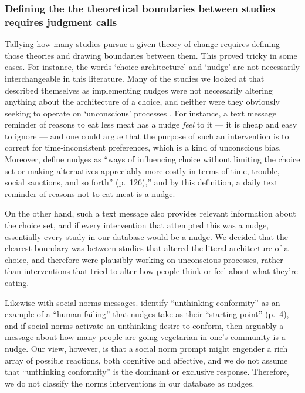 \documentclass[sn-nature,referee,pdflatex]{sn-jnl}
\begin{document}
\subsubsection{Defining the the theoretical boundaries between studies
requires judgment
calls}\label{defining-the-the-theoretical-boundaries-between-studies-requires-judgment-calls}

Tallying how many studies pursue a given theory of change requires
defining those theories and drawing boundaries between them. This proved
tricky in some cases. For instance, the words `choice architecture' and
`nudge' \citep{thaler2009} are not necessarily interchangeable in this
literature. Many of the studies we looked at that described themselves
as implementing nudges were not necessarily altering anything about the
architecture of a choice, and neither were they obviously seeking to
operate on `unconscious' processes \citep{garnett2020}. For instance, a
text message reminder of reasons to eat less meat has a nudge
\emph{feel} to it --- it is cheap and easy to ignore --- and one could
argue that the purpose of such an intervention is to correct for
time-inconsistent preferences, which is a kind of unconscious bias.
Moreover, \citep{hausman2010} define nudges as ``ways of influencing
choice without limiting the choice set or making alternatives
appreciably more costly in terms of time, trouble, social sanctions, and
so forth'' (p.~126),'' and by this definition, a daily text reminder of
reasons not to eat meat is a nudge.

On the other hand, such a text message also provides relevant
information about the choice set, and if every intervention that
attempted this was a nudge, essentially every study in our database
would be a nudge. We decided that the clearest boundary was between
studies that altered the literal architecture of a choice, and therefore
were plausibly working on unconscious processes, rather than
interventions that tried to alter how people think or feel about what
they're eating.

Likewise with social norms messages. \citep{mols2015} identify
``unthinking conformity'' as an example of a ``human failing'' that
nudges take as their ``starting point'' (p.~4), and if social norms
activate an unthinking desire to conform, then arguably a message about
how many people are going vegetarian in one's community is a nudge. Our
view, however, is that a social norm prompt might engender a rich array
of possible reactions, both cognitive and affective, and we do not
assume that ``unthinking conformity'' is the dominant or exclusive
response. Therefore, we do not classify the norms interventions in our
database as nudges.
\end{document}
